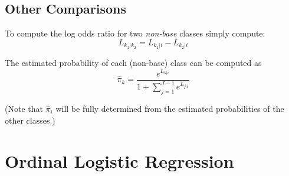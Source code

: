 \documentclass[12pt]{../notes}
\begin{document}
\subsection*{Other Comparisons}
To compute the log odds ratio for two \textit{non-base} classes simply compute:
$$L_{k_1|k_2} = L_{k_1|i} - L_{k_2|i}$$


The estimated probability of each (non-base) class can be computed as 
$$\hat{\pi}_k = \frac{e^{L_{k|i}}}{1 + \sum_{j=1}^{J-1}e^{L_{j|i}}}$$

(Note that $\hat{\pi}_i$ will be fully determined from the estimated probabilities of the other classes.)



\section{Ordinal Logistic Regression}
\end{document}
